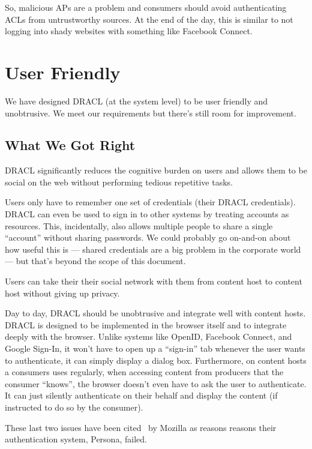 \documentclass[pdftex,12pt,a4papaer,twoside,notitlepage]{report}
\begin{document}
So, malicious APs are a problem and consumers should avoid authenticating ACLs
from untrustworthy sources. At the end of the day, this is similar to not
logging into shady websites with something like Facebook Connect.


\section{User Friendly}
\label{sec:user_friendly}

We have designed DRACL (at the system level) to be user friendly and
unobtrusive. We meet our requirements but there's still room for improvement.

\subsection{What We Got Right}

DRACL significantly reduces the cognitive burden on users and allows them to be
social on the web without performing tedious repetitive tasks.

Users only have to remember one set of credentials (their DRACL credentials).
DRACL can even be used to sign in to other systems by treating accounts as
resources. This, incidentally, also allows multiple people to share a single
``account'' without sharing passwords. We could probably go on-and-on about how
useful this is --- shared credentials are a big problem in the corporate world
--- but that's beyond the scope of this document.

Users can take their their social network with them from content host to content
host without giving up privacy.

Day to day, DRACL should be unobtrusive and integrate well with content hosts.
DRACL is designed to be implemented in the browser itself and to integrate
deeply with the browser. Unlike systems like OpenID, Facebook Connect, and
Google Sign-In, it won't have to open up a ``sign-in'' tab whenever the user
wants to authenticate, it can simply display a dialog box. Furthermore, on
content hosts a consumers uses regularly, when accessing content from producers
that the consumer ``knows'', the browser doesn't even have to ask the user to
authenticate. It can just silently authenticate on their behalf and display the
content (if instructed to do so by the consumer).

These last two issues have been cited~\cite{persona-fail} by Mozilla as reasons
reasons their authentication system, Persona, failed.
\end{document}
